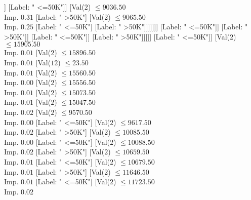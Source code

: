 \documentclass[margin=10pt]{standalone}
\begin{document}
\begin{forest}
																		[Label: " <=50K"]
																		[Val($2$) $ \leq 9033.50$ \\ Imp. $0.04$
																			[Val($2$) $ \leq 8900.50$ \\ Imp. $0.31$
																				[Val($2$) $ \leq 8887.50$ \\ Imp. $0.31$
																					[Label: " <=50K"]
																					[Label: " >50K"]]
																				[Label: " <=50K"]]
																			[Val($2$) $ \leq 9036.50$ \\ Imp. $0.31$
																				[Label: " >50K"]
																				[Val($2$) $ \leq 9065.50$ \\ Imp. $0.25$
																					[Label: " <=50K"]
																					[Label: " >50K"]]]]]]]
															[Label: " <=50K"]]
														[Label: " >50K"]]
													[Label: " <=50K"]]
												[Label: " >50K"]]]]]
								[Label: " <=50K"]]
							[Val($2$) $ \leq 15905.50$ \\ Imp. $0.01$
								[Val($2$) $ \leq 15896.50$ \\ Imp. $0.01$
									[Val($12$) $ \leq 23.50$ \\ Imp. $0.01$
										[Val($2$) $ \leq 15560.50$ \\ Imp. $0.00$
											[Val($2$) $ \leq 15556.50$ \\ Imp. $0.01$
												[Val($2$) $ \leq 15073.50$ \\ Imp. $0.01$
													[Val($2$) $ \leq 15047.50$ \\ Imp. $0.02$
														[Val($2$) $ \leq 9570.50$ \\ Imp. $0.00$
															[Label: " <=50K"]
															[Val($2$) $ \leq 9617.50$ \\ Imp. $0.02$
																[Label: " >50K"]
																[Val($2$) $ \leq 10085.50$ \\ Imp. $0.00$
																	[Label: " <=50K"]
																	[Val($2$) $ \leq 10088.50$ \\ Imp. $0.02$
																		[Label: " >50K"]
																		[Val($2$) $ \leq 10659.50$ \\ Imp. $0.01$
																			[Label: " <=50K"]
																			[Val($2$) $ \leq 10679.50$ \\ Imp. $0.01$
																				[Label: " >50K"]
																				[Val($2$) $ \leq 11646.50$ \\ Imp. $0.01$
																					[Label: " <=50K"]
																					[Val($2$) $ \leq 11723.50$ \\ Imp. $0.02$

\end{forest}
\end{document}

